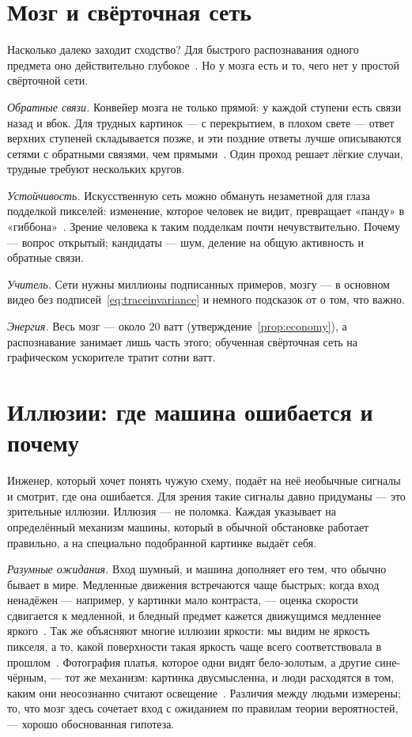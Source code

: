 \section{Мозг и свёрточная сеть}

Насколько далеко заходит сходство? Для быстрого распознавания одного предмета оно действительно глубокое~\cite{Yamins2014}. Но у мозга есть и то, чего нет у простой свёрточной сети.

\emph{Обратные связи.} Конвейер мозга не только прямой: у каждой ступени есть связи назад и вбок. Для трудных картинок --- с перекрытием, в плохом свете --- ответ верхних ступеней складывается позже, и эти поздние ответы лучше описываются сетями с обратными связями, чем прямыми~\cite{Kar2019}. Один проход решает лёгкие случаи, трудные требуют нескольких кругов.

\emph{Устойчивость.} Искусственную сеть можно обмануть незаметной для глаза подделкой пикселей: изменение, которое человек не видит, превращает «панду» в «гиббона»~\cite{Szegedy2014}. Зрение человека к таким подделкам почти нечувствительно. Почему --- вопрос открытый; кандидаты --- шум, деление на общую активность и обратные связи.

\emph{Учитель.} Сети нужны миллионы подписанных примеров, мозгу --- в основном видео без подписей~\eqref{eq:traceinvariance} и немного подсказок от  о том, что важно.

\emph{Энергия.} Весь мозг --- около $20$ ватт (утверждение~\ref{prop:economy}), а распознавание занимает лишь часть этого; обученная свёрточная сеть на графическом ускорителе тратит сотни ватт.

\section{Иллюзии: где машина ошибается и почему}
\label{sec:illusions}

Инженер, который хочет понять чужую схему, подаёт на неё необычные сигналы и смотрит, где она ошибается. Для зрения такие сигналы давно придуманы --- это зрительные иллюзии. Иллюзия --- не поломка. Каждая указывает на определённый механизм машины, который в обычной обстановке работает правильно, а на специально подобранной картинке выдаёт себя.

\emph{Разумные ожидания.} Вход шумный, и машина дополняет его тем, что обычно бывает в мире. Медленные движения встречаются чаще быстрых; когда вход ненадёжен --- например, у картинки мало контраста, --- оценка скорости сдвигается к медленной, и бледный предмет кажется движущимся медленнее яркого~\cite{Weiss2002}. Так же объясняют многие иллюзии яркости: мы видим не яркость пикселя, а то, какой поверхности такая яркость чаще всего соответствовала в прошлом~\cite{Purves2011}. Фотография платья, которое одни видят бело-золотым, а другие сине-чёрным, --- тот же механизм: картинка двусмысленна, и люди расходятся в том, каким они неосознанно считают освещение~\cite{LaferSousa2015,Wallisch2017}. Различия между людьми измерены; то, что мозг здесь сочетает вход с ожиданием по правилам теории вероятностей, --- хорошо обоснованная гипотеза.

